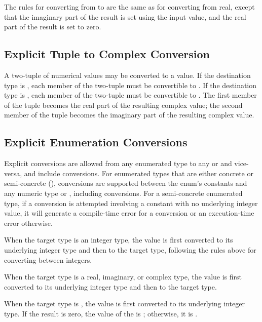 The rules for converting from  to  are the same as for
converting from real, except that the imaginary part of the result is set using
the input value, and the real part of the result is set to zero.

\subsection{Explicit Tuple to Complex Conversion}
\label{Explicit_Tuple_to_Complex_Conversion}

A two-tuple of numerical values may be converted to a  value.  If
the destination type is , each member of the two-tuple must
be convertible to .  If the destination type
is , each member of the two-tuple must be convertible
to .  The first member of the tuple becomes the real part of the
resulting complex value; the second member of the tuple becomes the imaginary
part of the resulting complex value.

\subsection{Explicit Enumeration Conversions}
\label{Explicit_Enumeration_Conversions}

Explicit conversions are allowed from any enumerated type to any
 or  and vice-versa, and include  conversions.
For enumerated types that are either concrete or semi-concrete
(), conversions are supported between the
enum's constants and any numeric type or ,
including  conversions.  For a semi-concrete enumerated
type, if a conversion is attempted involving a constant with no
underlying integer value, it will generate a compile-time error for
a  conversion or an execution-time error otherwise.

When the target type is an integer type, the value is first converted to its
underlying integer type and then to the target type, following the rules above
for converting between integers.

When the target type is a real, imaginary, or complex type, the value
is first converted to its underlying integer type and then to the
target type.

When the target type is , the value is first converted to its
underlying integer type.  If the result is zero, the value of the 
is ; otherwise, it is .


